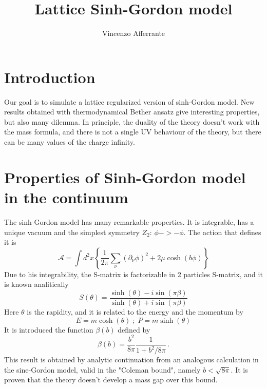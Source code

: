 \documentclass[12pt,a4paper]{report}
\begin{document}
 

 
\title{Lattice Sinh-Gordon model }
\author{Vincenzo Afferrante} 
 
\maketitle

\chapter{Introduction} 

Our goal is to simulate  a lattice regularized version of sinh-Gordon model. New results obtained with thermodynamical Bether ansatz give interesting properties, but also many dilemma. In principle, the duality of the theory doesn't work with the mass formula, and there is not a single UV behaviour of the theory, but there can be many values of the charge infinity.

\chapter{Properties of Sinh-Gordon model in the continuum }

The sinh-Gordon model has many remarkable properties. It is integrable, has a unique vacuum and the simplest symmetry $Z_2$: $\phi -> -\phi$. The action that defines it is \begin{equation}
\mathcal{A} = \int d^2x \left\lbrace\dfrac{1}{2 \pi} \sum_\nu (\partial_\nu \phi )^2 + 2 \mu \cosh(b \phi) \right\rbrace 
\end{equation} Due to his integrability, the S-matrix is factorizable in 2 particles S-matrix, and it is known analitically \begin{equation}
S(\theta) = \dfrac{\sinh(\theta) -i \sin (\pi \beta)}{\sinh(\theta) +i \sin (\pi \beta) }
\end{equation} Here $\theta$ is the rapidity, and it is related to the energy and the momentum by \begin{equation}
E = m \cosh(\theta) \; ; \; P = m \sinh(\theta)
\end{equation} It is introduced the function $\beta(b)$ defined by \begin{equation}
\beta(b) =  \dfrac{b^2}{8\pi} \dfrac{1}{1+ b^2/8 \pi} \,.
\end{equation} This result is obtained by analytic continuation from an analogous calculation in the sine-Gordon model, valid in the "Coleman bound", namely $b < \sqrt{8\pi}$. It is proven that the theory doesn't develop a mass gap over this bound. 
\end{document}
